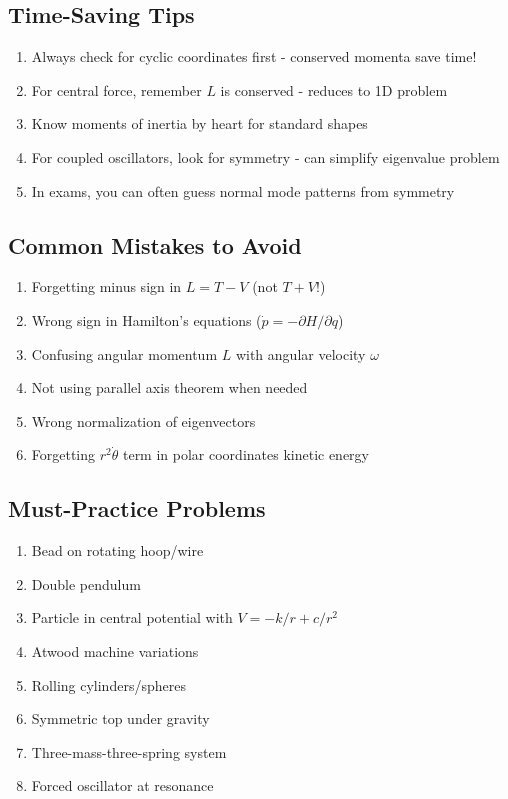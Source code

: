 \documentclass[12pt,a4paper]{article}
\theoremstyle{definition}
\begin{document}
\subsection{Time-Saving Tips}

\begin{enumerate}
    \item Always check for cyclic coordinates first - conserved momenta save time!
    \item For central force, remember $L$ is conserved - reduces to 1D problem
    \item Know moments of inertia by heart for standard shapes
    \item For coupled oscillators, look for symmetry - can simplify eigenvalue problem
    \item In exams, you can often guess normal mode patterns from symmetry
\end{enumerate}

\subsection{Common Mistakes to Avoid}

\begin{enumerate}
    \item Forgetting minus sign in $L = T - V$ (not $T + V$!)
    \item Wrong sign in Hamilton's equations ($\dot{p} = -\partial H/\partial q$)
    \item Confusing angular momentum $L$ with angular velocity $\omega$
    \item Not using parallel axis theorem when needed
    \item Wrong normalization of eigenvectors
    \item Forgetting $r^2\dot{\theta}$ term in polar coordinates kinetic energy
\end{enumerate}

\subsection{Must-Practice Problems}

\begin{enumerate}
    \item Bead on rotating hoop/wire
    \item Double pendulum
    \item Particle in central potential with $V = -k/r + c/r^2$
    \item Atwood machine variations
    \item Rolling cylinders/spheres
    \item Symmetric top under gravity
    \item Three-mass-three-spring system
    \item Forced oscillator at resonance
\end{enumerate}
\end{document}
